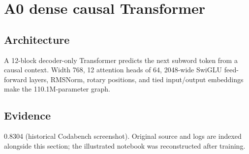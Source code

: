 \section{A0 dense causal Transformer}
\subsection{Architecture} A 12-block decoder-only Transformer predicts the next subword token from a causal context. Width 768, 12 attention heads of 64, 2048-wide SwiGLU feed-forward layers, RMSNorm, rotary positions, and tied input/output embeddings make the 110.1M-parameter graph.
\subsection{Evidence} 0.8304 (historical Codabench screenshot). Original source and logs are indexed alongside this section; the illustrated notebook was reconstructed after training.
